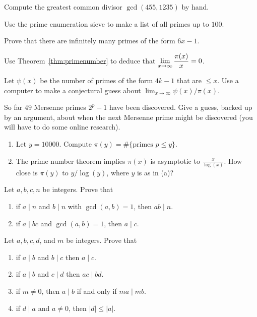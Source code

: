 \begin{exercises}

\item Compute the greatest common divisor $\gcd(455,1235)$ by hand.

\item\label{ex:handsieve} Use the prime enumeration sieve
to make a list of all primes up to $100$.

\item\label{ex:primesform} Prove that there are infinitely
many primes of the form $6x-1$.

\item \label{ex:fewprimes}
Use Theorem~\ref{thm:primenumber} to deduce that
$\displaystyle \lim_{x\to\infty} \frac{\pi(x)}{x} = 0$.

\item Let $\psi(x)$ be the number of primes of the form
$4k-1$ that are $\leq x$.  Use a computer to make a conjectural
guess about $\lim_{x\to\infty} \psi(x) / \pi(x)$.

\item So far $49$ Mersenne primes $2^p-1$ have been discovered.
Give a guess, backed up by an argument, about
when the next Mersenne prime might be discovered (you will have
to do some online research).

\item
 \begin{enumerate}
\item Let $y=10000$.  Compute
  $\pi(y) = \#\{ \text{primes } p \leq y\}.$
\item The prime number theorem implies $\pi(x)$ is
asymptotic to $\frac{x}{\log(x)}$.  How close is $\pi(y)$ to
$y/\log(y)$, where $y$ is as in (a)?
\end{enumerate}

\item Let $a,b,c,n$ be integers.  Prove that
\begin{enumerate}
\item if $a \mid n$ and $b\mid n$ with $\gcd(a,b)=1$, then $ab\mid n$.
\item if $a\mid bc$ and $\gcd(a,b)=1$, then $a\mid c$.
\end{enumerate}

\item Let $a,b,c,d$, and $m$ be integers.  Prove that
\begin{enumerate}
\item if $a\mid b$ and $b\mid c$ then $a\mid c$. %
\item if $a\mid b$ and $c\mid d$ then $ac\mid bd$.
\item if $m\neq 0$, then $a\mid b$ if and only if $ma\mid mb$.
\item if $d\mid a$ and $a\neq 0$, then $|d|\leq |a|$.
\end{enumerate}


\end{exercises}
